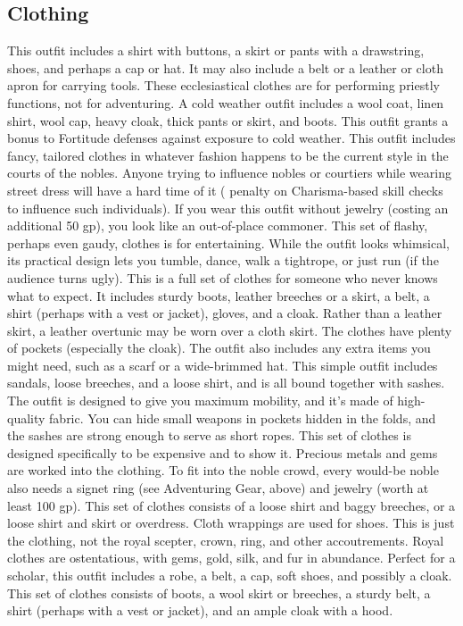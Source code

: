 \subsection{Clothing}
 This outfit includes a shirt with buttons, a skirt or pants with a drawstring, shoes, and perhaps a cap or hat. It may also include a belt or a leather or cloth apron for carrying tools.
 These ecclesiastical clothes are for performing priestly functions, not for adventuring.
 A cold weather outfit includes a wool coat, linen shirt, wool cap, heavy cloak, thick pants or skirt, and
boots. This outfit grants a  bonus to Fortitude defenses against exposure to cold weather.
 This outfit includes fancy, tailored clothes in whatever fashion happens to be the current style in the courts of the nobles. Anyone trying to influence nobles or courtiers while wearing street dress will have a hard time of it ( penalty on Charisma-based skill checks to influence such individuals). If you wear this outfit without jewelry (costing an additional 50 gp), you look like an out-of-place commoner.
 This set of flashy, perhaps even gaudy, clothes is for entertaining. While the outfit looks whimsical, its practical design lets you tumble, dance, walk a tightrope, or just run (if the audience turns ugly).
 This is a full set of clothes for someone who never knows what to expect. It includes sturdy boots, leather breeches or a skirt, a belt, a shirt (perhaps with a vest or jacket), gloves, and a cloak. Rather than a leather skirt, a leather overtunic may be worn over a cloth skirt. The clothes have plenty of pockets (especially the cloak). The outfit also includes any extra items you might need, such as a scarf or a wide-brimmed hat.
 This simple outfit includes sandals, loose breeches, and a loose shirt, and is all bound together with sashes. The outfit is designed to give you maximum mobility, and it's made of high-quality fabric. You can hide small weapons in pockets hidden in the folds, and the sashes are strong enough to serve as short ropes.
 This set of clothes is designed specifically to be expensive and to show it. Precious metals and gems are worked into the clothing. To fit into the noble crowd, every would-be noble also needs a signet ring (see Adventuring Gear, above) and jewelry (worth at least 100 gp).
 This set of clothes consists of a loose shirt and baggy breeches, or a loose shirt and skirt or overdress. Cloth wrappings are used for shoes.
 This is just the clothing, not the royal scepter, crown, ring, and other accoutrements. Royal clothes are ostentatious, with gems, gold, silk, and fur in abundance.
 Perfect for a scholar, this outfit includes a robe, a belt, a cap, soft shoes, and possibly a cloak.
 This set of clothes consists of boots, a wool skirt or breeches, a sturdy belt, a shirt (perhaps with a vest or jacket), and an ample cloak with a hood.


